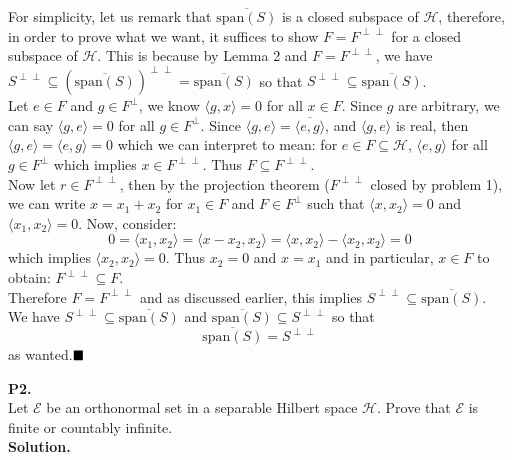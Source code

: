 \documentclass{article}
\begin{document}
    For simplicity, let us remark that $\overline{\text{span}(S)}$ is a closed subspace of $\mathcal{H}$, therefore, in order to prove
    what we want, it suffices to show $F = F^{\perp\perp}$ for a closed subspace of $\mathcal{H}$. This is because by Lemma 2 and
    $F = F^{\perp\perp}$, we have $S^{\perp\perp}\subseteq(\overline{\text{span}(S)})^{\perp\perp} = \overline{\text{span}(S)}$ so that
    $S^{\perp\perp}\subseteq \overline{\text{span}(S)}$.\\
    Let $e\in F$ and $g\in F^{\perp}$, we know $\langle g,x\rangle=0$ for all $x\in F$. Since $g$ are
    arbitrary, we can say $\langle g,e\rangle = 0$ for all $g\in F^{\perp}$. Since $\langle g,e\rangle = 
    \overline{\langle e,g\rangle}$, and $\langle g,e\rangle$ is real, then $\langle g,e\rangle = \langle e,g\rangle = 0$ which we
    can interpret to mean: for $e\in F\subseteq \mathcal{H}$, $\langle e,g\rangle$ for all $g\in F^{\perp}$ which implies
    $x\in F^{\perp\perp}$. Thus $F\subseteq F^{\perp\perp}$.\\
    Now let $r\in F^{\perp\perp}$, then by the projection theorem ($F^{\perp\perp}$ closed by problem 1), 
    we can write $x = x_1 + x_2$ for $x_1\in F$ and $F\in F^{\perp}$
    such that $\langle x,x_2\rangle = 0$ and $\langle x_1,x_2\rangle = 0$. Now, consider:
    \[ 0 = \langle x_1,x_2\rangle = \langle x - x_2,x_2\rangle = \langle x,x_2\rangle - \langle x_2,x_2\rangle = 0 \]
    which implies $\langle x_2,x_2\rangle = 0$. Thus $x_2 = 0$ and $x = x_1$ and in particular, $x\in F$ to obtain: 
    $F^{\perp\perp}\subseteq F$.\\
    Therefore $F = F^{\perp\perp}$ and as discussed earlier, this implies $S^{\perp\perp}\subseteq\overline{\text{span}(S)}$.\\
    We have $S^{\perp\perp}\subseteq\overline{\text{span}(S)}$ and $\overline{\text{span}(S)}\subseteq S^{\perp\perp}$ so that
    \[ \overline{\text{span}(S)} = S^{\perp\perp} \]
    as wanted.$\hfill\blacksquare$\\

    \newpage

    \textbf{P2.}\\

    Let $\mathcal{E}$ be an orthonormal set in a separable Hilbert space $\mathcal{H}$. Prove that $\mathcal{E}$ is finite or
    countably infinite.\\

    \textbf{Solution.}\\
\end{document}
